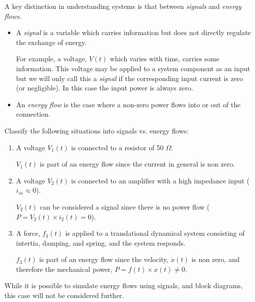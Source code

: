 A key distinction in understanding systems is that between {\it signals} and {\it energy flows}.


\begin{itemize}
  \item  A {\it signal} is a variable which carries information but does not directly regulate the exchange of energy.

For example,  a voltage, $V(t)$ which varies with time, carries some information.   This voltage may be applied to a system component as an input but we will only call this a {\it signal} if the corresponding input current is zero (or negligible).  In this case the input power is always zero.

  \item  An {\it energy flow} is the case where a non-zero power flows into or out of the connection.
\end{itemize}

\begin{ExampleSmall}
Classify the following situations into signals vs. energy flows:

\begin{enumerate}
  \item  A voltage $V_1(t)$ is connected to a resistor of 50 $\Omega$.

  $V_1(t)$  is part of an energy flow since the current in general is non zero.

  \item A voltage $V_2(t)$ is connected to an amplifier with a high impedance input ($i_{in} \approx 0$).

  $V_2(t)$ can be considered a signal since there is no power flow ($P=V_2(t)\times i_2(t) = 0$).


  \item A force, $f_3(t)$ is applied to a translational dynamical system consisting of intertia, damping, and spring, and the system responds.

  $f_3(t)$ is part of an energy flow since the velocity, $\dot{x}(t)$ is non zero, and therefore the mechanical power,
  $P = f(t)\times \dot{x}(t) \neq 0$.

\end{enumerate}

\end{ExampleSmall}


While it is possible to simulate energy flows using signals, and block diagrams, this case will not be considered further.



